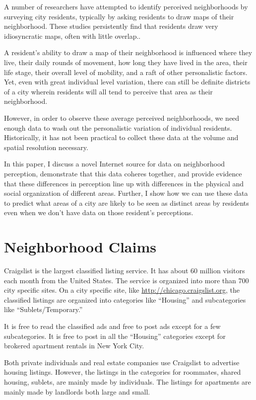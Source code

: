 \documentclass[12pt,letter]{article}\usepackage[]{graphicx}\usepackage[]{color}
\let\cite=\citep
\begin{document}
A number of researchers have attempted to identify perceived
neighborhoods by surveying city residents, typically by asking
residents to draw maps of their neighborhood. These studies
persistently find that residents draw very idiosyncratic maps, often
with little overlap.\cite{hunter_symbolic_1974, campbell_subjective_2009}.

A resident's ability to draw a map of their neighborhood is influenced
where they live, their daily rounds of movement, how long they have
lived in the area, their life stage, their overall level of mobility,
and a raft of other personalistic factors\cite{needed}. Yet, even with great
individual level variation, there can still be definite districts of
a city wherein residents will all tend to perceive that area as their
neighborhood.

However, in order to observe these average perceived neighborhoods, we
need enough data to wash out the personalistic variation of individual
residents. Historically, it has not been practical to collect these
data at the volume and spatial resolution necessary.

In this paper, I discuss a novel Internet source for data on
neighborhood perception, demonstrate that this data coheres together,
and provide evidence that these differences in perception line up with
differences in the physical and social organization of different
areas. Further, I show how we can use these data to predict what areas
of a city are likely to be seen as distinct areas by residents even
when we don't have data on those resident's perceptions.

\section*{Neighborhood Claims}
Craigslist is the largest classified listing service. It
has about 60 million visitors each month from the United States. The
service is organized into more than 700 city specific sites. On a city
specific site, like \url{http://chicago.craigslist.org}, the
classified listings are organized into categories like ``Housing'' and 
subcategories like ``Sublets/Temporary.'' 

It is free to read the classified ads and free to post ads except for
a few subcategories. It is free to post in all the ``Housing''
categories except for brokered apartment rentals in New York City. 

Both private individuals and real estate companies use Craigslist to
advertise housing listings. However, the listings in the categories
for roommates, shared housing, sublets, are mainly made by
individuals. The listings for apartments are mainly made by landlords
both large and small. 
\end{document}
